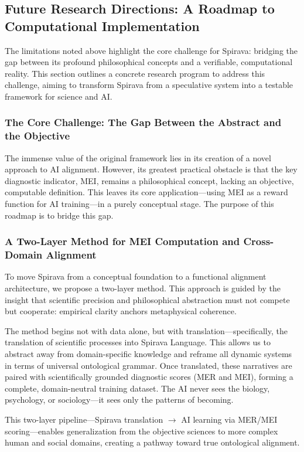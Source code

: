 \documentclass[11pt, a4paper]{article}
\begin{document}
\subsection{Future Research Directions: A Roadmap to Computational Implementation}
The limitations noted above highlight the core challenge for Spirava: bridging the gap between its profound philosophical concepts and a verifiable, computational reality. This section outlines a concrete research program to address this challenge, aiming to transform Spirava from a speculative system into a testable framework for science and AI.

\subsubsection{The Core Challenge: The Gap Between the Abstract and the Objective}
The immense value of the original framework lies in its creation of a novel approach to AI alignment. However, its greatest practical obstacle is that the key diagnostic indicator, MEI, remains a philosophical concept, lacking an objective, computable definition. This leaves its core application—using MEI as a reward function for AI training—in a purely conceptual stage. The purpose of this roadmap is to bridge this gap.

\subsubsection{A Two-Layer Method for MEI Computation and Cross-Domain Alignment}
To move Spirava from a conceptual foundation to a functional alignment architecture, we propose a two-layer method. This approach is guided by the insight that scientific precision and philosophical abstraction must not compete but cooperate: empirical clarity anchors metaphysical coherence.

The method begins not with data alone, but with translation—specifically, the translation of scientific processes into Spirava Language. This allows us to abstract away from domain-specific knowledge and reframe all dynamic systems in terms of universal ontological grammar. Once translated, these narratives are paired with scientifically grounded diagnostic scores (MER and MEI), forming a complete, domain-neutral training dataset. The AI never sees the biology, psychology, or sociology—it sees only the patterns of becoming.

This two-layer pipeline—Spirava translation $\rightarrow$ AI learning via MER/MEI scoring—enables generalization from the objective sciences to more complex human and social domains, creating a pathway toward true ontological alignment.
\end{document}
